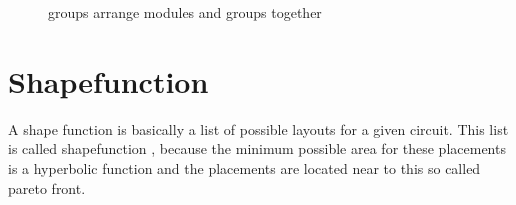 \begin{figure}
	\centering
	\caption{groups arrange modules and groups together}
	\label{fig:group_of_modules}
\end{figure}

\section{Shapefunction}
A shape function is basically a list of possible layouts for a given circuit. This list is called shapefunction , because the minimum possible area for these placements is a hyperbolic function and the placements are located near to this so called pareto front.

